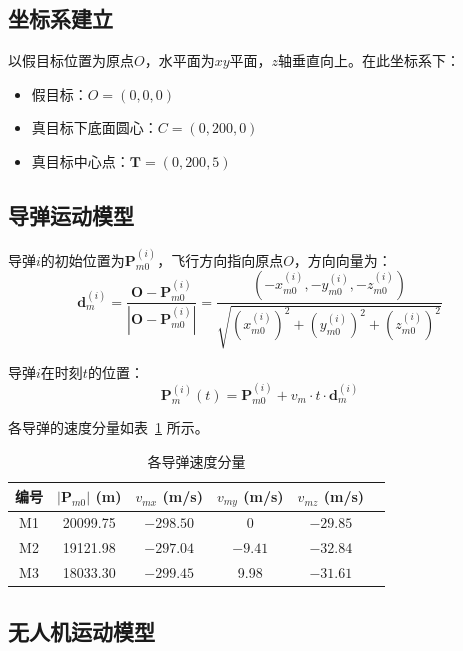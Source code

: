 \documentclass[12pt,a4paper]{article}
\newcommand{\vect}[1]{\boldsymbol{#1}}
\begin{document}
\subsection{坐标系建立}

以假目标位置为原点$O$，水平面为$xy$平面，$z$轴垂直向上。在此坐标系下：
\begin{itemize}
    \item 假目标：$O = (0, 0, 0)$
    \item 真目标下底面圆心：$C = (0, 200, 0)$
    \item 真目标中心点：$\vect{T} = (0, 200, 5)$
\end{itemize}

\subsection{导弹运动模型}

导弹$i$的初始位置为$\vect{P}_{m0}^{(i)}$，飞行方向指向原点$O$，方向向量为：
\begin{equation}
    \vect{d}_m^{(i)} = \frac{\vect{O} - \vect{P}_{m0}^{(i)}}{|\vect{O} - \vect{P}_{m0}^{(i)}|} = \frac{(-x_{m0}^{(i)}, -y_{m0}^{(i)}, -z_{m0}^{(i)})}{\sqrt{(x_{m0}^{(i)})^2 + (y_{m0}^{(i)})^2 + (z_{m0}^{(i)})^2}}
\end{equation}

导弹$i$在时刻$t$的位置：
\begin{equation}
    \vect{P}_m^{(i)}(t) = \vect{P}_{m0}^{(i)} + v_m \cdot t \cdot \vect{d}_m^{(i)}
    \label{eq:missile_traj}
\end{equation}

各导弹的速度分量如表~\ref{tab:missile_vel} 所示。

\begin{table}[H]
    \centering
    \caption{各导弹速度分量}
    \label{tab:missile_vel}
    \begin{tabular}{cccccc}
        \toprule
        编号 & $|\vect{P}_{m0}|$ (m) & $v_{mx}$ (m/s) & $v_{my}$ (m/s) & $v_{mz}$ (m/s) \\
        \midrule
        M1 & 20099.75 & $-298.50$ & 0 & $-29.85$ \\
        M2 & 19121.98 & $-297.04$ & $-9.41$ & $-32.84$ \\
        M3 & 18033.30 & $-299.45$ & 9.98 & $-31.61$ \\
        \bottomrule
    \end{tabular}
\end{table}

\subsection{无人机运动模型}
\end{document}
